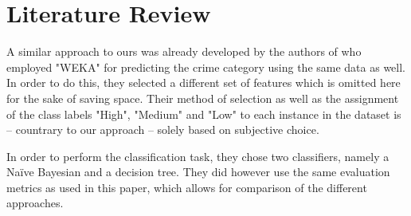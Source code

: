 \section{Literature Review}
A similar approach to ours was already developed by the authors of
\cite{indian} who employed "WEKA" for predicting the crime category
using the same data as well. In order to do this, they selected a
different set of features which is omitted here for the sake of saving
space. Their method of selection as well as the assignment of the
class labels "High", "Medium" and "Low" to each instance in the
dataset is -- countrary to our approach -- solely based on subjective
choice.

In order to perform the classification task, they chose two
classifiers, namely a Na\"ive Bayesian and a decision tree. They did
however use the same evaluation metrics as used in this paper, which
allows for comparison of the different approaches.\\



